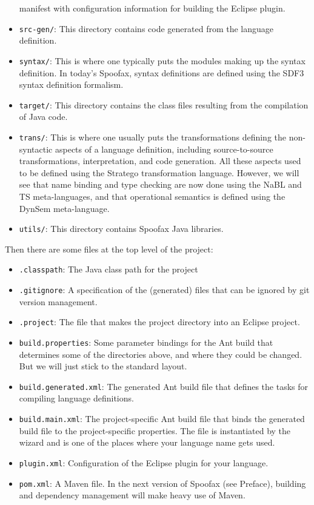 \begin{itemize}
  manifest with configuration information for building the Eclipse plugin.
  \item \texttt{src-gen/}: This directory contains code generated from the
  language definition.
  \item \texttt{syntax/}: This is where one typically puts the modules making up
  the syntax definition. In today's Spoofax, syntax definitions are defined
  using the SDF3 syntax definition formalism.
  \item \texttt{target/}: This directory contains the class files resulting from
  the compilation of Java code.
  \item \texttt{trans/}: This is where one usually puts the transformations
  defining the non-syntactic aspects of a language definition, including
  source-to-source transformations, interpretation, and code generation. All
  these aspects used to be defined using the Stratego transformation language.
  However, we will see that name binding and type checking are now done using
  the NaBL and TS meta-languages, and that operational semantics is defined
  using the DynSem meta-language.
  \item \texttt{utils/}: This directory contains Spoofax Java libraries.
\end{itemize}

Then there are some files at the top level of the project:

\begin{itemize}
  \item \texttt{.classpath}: The Java class path for the project
  \item \texttt{.gitignore}: A specification of the (generated) files that can
  be ignored by git version management.
  \item \texttt{.project}: The file that makes the project directory into an
  Eclipse project.
  \item \texttt{build.properties}: Some parameter bindings for the Ant build
  that determines some of the directories above, and where they could be
  changed. But we will just stick to the standard layout.
  \item \texttt{build.generated.xml}: The generated Ant build file that defines
  the tasks for compiling language definitions.
  \item \texttt{build.main.xml}: The project-specific Ant build file that binds
  the generated build file to the project-specific properties. The file is
  instantiated by the wizard and is one of the places where your language name
  gets used.
  \item \texttt{plugin.xml}: Configuration of the Eclipse plugin for your
  language.
  \item \texttt{pom.xml}: A Maven file. In the next version of Spoofax (see
  Preface), building and dependency management will make heavy use of Maven.
\end{itemize}

